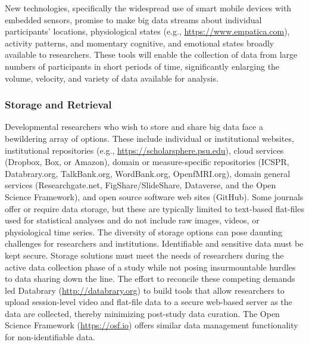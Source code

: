 \documentclass[letterpaper,man,apacite,natbib]{apa6}
\begin{document}
New technologies, specifically the widespread use of smart mobile devices with embedded sensors, promise to make big data streams about individual participants' locations, physiological states (e.g., \url{https://www.empatica.com}), activity patterns, and momentary cognitive, and emotional states broadly available to researchers.
These tools will enable the collection of data from large numbers of participants in short periods of time, significantly enlarging the volume, velocity, and variety of data available for analysis.   
\subsubsection{Storage and Retrieval}
Developmental researchers who wish to store and share big data face a bewildering array of options.
These include individual or institutional websites, institutional repositories (e.g., \url{https://scholarsphere.psu.edu}), cloud services (Dropbox, Box, or Amazon), domain or measure-specific repositories (ICSPR, Databrary.org, TalkBank.org, WordBank.org, OpenfMRI.org), domain general services (Researchgate.net, FigShare/SlideShare, Dataverse, and the Open Science Framework), and open source software web sites (GitHub).
Some journals offer or require data storage, but these are typically limited to text-based flat-files used for statistical analyses and do not include raw images, videos, or physiological time series.
The diversity of storage options can pose daunting challenges for researchers and institutions.
Identifiable and sensitive data must be kept secure.
Storage solutions must meet the needs of researchers during the active data collection phase of a study while not posing insurmountable hurdles to data sharing down the line.
The effort to reconcile these competing demands led Databrary (\url{http://databrary.org}) to build tools that allow researchers to upload session-level video and flat-file data to a secure web-based server as the data are collected, thereby minimizing post-study data curation.
The Open Science Framework (\url{https://osf.io}) offers similar data management functionality for non-identifiable data.
\end{document}
